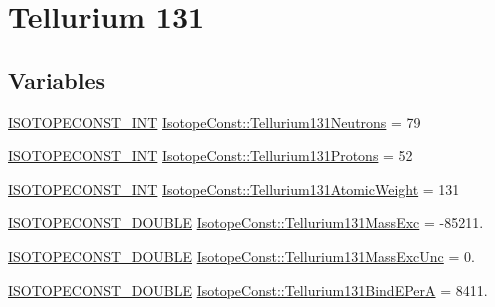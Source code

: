\hypertarget{group___isotope_const-_tellurium-_te131}{}\section{Tellurium 131}
\label{group___isotope_const-_tellurium-_te131}
\subsection*{Variables}
\begin{DoxyCompactItemize}
\item 
\mbox{\hyperlink{group___isotope_const-_macros_ga5f18360b3e99483a35c32d789e62621c}{I\+S\+O\+T\+O\+P\+E\+C\+O\+N\+S\+T\+\_\+\+I\+NT}} \mbox{\hyperlink{group___isotope_const-_tellurium-_te131_gacb9084e286a93676517bf607640292d8}{Isotope\+Const\+::\+Tellurium131\+Neutrons}} = 79
\item 
\mbox{\hyperlink{group___isotope_const-_macros_ga5f18360b3e99483a35c32d789e62621c}{I\+S\+O\+T\+O\+P\+E\+C\+O\+N\+S\+T\+\_\+\+I\+NT}} \mbox{\hyperlink{group___isotope_const-_tellurium-_te131_ga17c79ac9fa436442209661339acc1152}{Isotope\+Const\+::\+Tellurium131\+Protons}} = 52
\item 
\mbox{\hyperlink{group___isotope_const-_macros_ga5f18360b3e99483a35c32d789e62621c}{I\+S\+O\+T\+O\+P\+E\+C\+O\+N\+S\+T\+\_\+\+I\+NT}} \mbox{\hyperlink{group___isotope_const-_tellurium-_te131_ga4e2f6746126c4d986cbc34f4a1d024c3}{Isotope\+Const\+::\+Tellurium131\+Atomic\+Weight}} = 131
\item 
\mbox{\hyperlink{group___isotope_const-_macros_ga8f45a7272ce02c0b4c65c44636ed719a}{I\+S\+O\+T\+O\+P\+E\+C\+O\+N\+S\+T\+\_\+\+D\+O\+U\+B\+LE}} \mbox{\hyperlink{group___isotope_const-_tellurium-_te131_ga6b2db016fe02687a711ab791b2834828}{Isotope\+Const\+::\+Tellurium131\+Mass\+Exc}} = -\/85211.
\item 
\mbox{\hyperlink{group___isotope_const-_macros_ga8f45a7272ce02c0b4c65c44636ed719a}{I\+S\+O\+T\+O\+P\+E\+C\+O\+N\+S\+T\+\_\+\+D\+O\+U\+B\+LE}} \mbox{\hyperlink{group___isotope_const-_tellurium-_te131_ga3d14c4668017d93d49bf6c434ab5e370}{Isotope\+Const\+::\+Tellurium131\+Mass\+Exc\+Unc}} = 0.
\item 
\mbox{\hyperlink{group___isotope_const-_macros_ga8f45a7272ce02c0b4c65c44636ed719a}{I\+S\+O\+T\+O\+P\+E\+C\+O\+N\+S\+T\+\_\+\+D\+O\+U\+B\+LE}} \mbox{\hyperlink{group___isotope_const-_tellurium-_te131_ga37e149d98bade14192e730d5c8060f67}{Isotope\+Const\+::\+Tellurium131\+Bind\+E\+PerA}} = 8411.
\item 

\end{DoxyCompactItemize}
